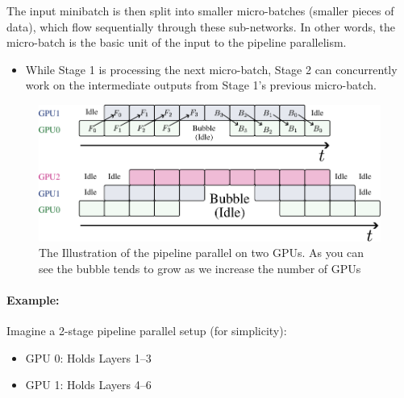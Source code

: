 {The input minibatch is then split into smaller micro-batches (smaller pieces of data), which flow sequentially through these sub-networks. In other words, the micro-batch is the basic unit of the input to the pipeline parallelism. 
\begin{itemize}
	\item While Stage 1 is processing the next micro-batch, Stage 2 can concurrently work on the intermediate outputs from Stage 1's previous micro-batch.
\end{itemize}

\begin{figure}[t]
	\centering
	\includegraphics[scale=0.8]{./images/pipeline.pdf}
	\caption{The Illustration of the pipeline parallel on two GPUs. As you can see the bubble tends to grow as we increase the number of GPUs}
\end{figure}

\paragraph{Example:} Imagine a 2-stage pipeline parallel setup (for simplicity):

\begin{itemize}
	\item GPU 0: Holds Layers 1–3  
	\item GPU 1: Holds Layers 4–6  
\end{itemize}

}
